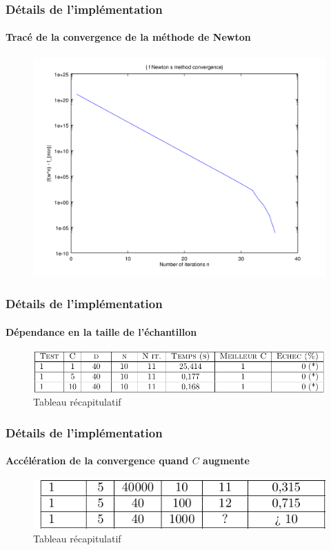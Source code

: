 \documentclass{beamer}
\begin{document}
\begin{frame}
\tableofcontents[currentsubsection]
\end{frame}

\begin{frame}
\frametitle{Détails de l'implémentation}
\framesubtitle{Tracé de la convergence de la méthode de Newton}

         \begin{figure}
         \centering
         \includegraphics[scale=0.4]{images/cvnewton4.png}
         \end{figure}

\end{frame}

\begin{frame}
\frametitle{Détails de l'implémentation}
\framesubtitle{Dépendance en la taille de l'échantillon}

         \begin{figure}
         \centering
         \caption{Tableau récapitulatif}
         \includegraphics[scale=0.4]{images/tabl1.png}
         \end{figure}

\end{frame}

\begin{frame}
\frametitle{Détails de l'implémentation}
\framesubtitle{Accélération de la convergence quand $C$ augmente}

         \begin{figure}
         \centering
         \caption{Tableau récapitulatif}
         \includegraphics[scale=0.6]{images/tabl2.png}
         \end{figure}

\end{frame}
\end{document}
